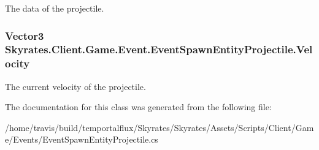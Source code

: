 The data of the projectile. 

\hypertarget{class_skyrates_1_1_client_1_1_game_1_1_event_1_1_event_spawn_entity_projectile_a585b4f98f506b65fca022f40d8187c1e}{
\subsubsection[{Velocity}]{\setlength{\rightskip}{0pt plus 5cm}Vector3 Skyrates.\-Client.\-Game.\-Event.\-Event\-Spawn\-Entity\-Projectile.\-Velocity}}\label{class_skyrates_1_1_client_1_1_game_1_1_event_1_1_event_spawn_entity_projectile_a585b4f98f506b65fca022f40d8187c1e}


The current velocity of the projectile. 



The documentation for this class was generated from the following file\-:\begin{DoxyCompactItemize}
\item 
/home/travis/build/temportalflux/\-Skyrates/\-Skyrates/\-Assets/\-Scripts/\-Client/\-Game/\-Events/Event\-Spawn\-Entity\-Projectile.\-cs\end{DoxyCompactItemize}
